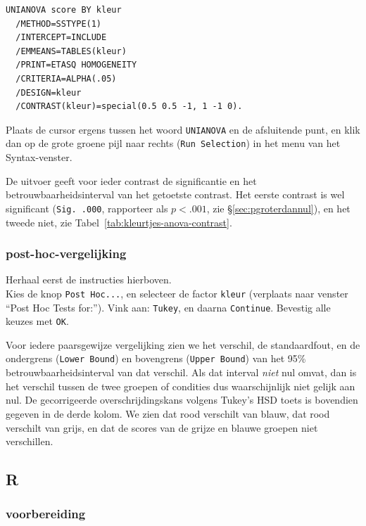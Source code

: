 \documentclass[
]{book}
\begin{document}
\begin{verbatim}
UNIANOVA score BY kleur
  /METHOD=SSTYPE(1)
  /INTERCEPT=INCLUDE
  /EMMEANS=TABLES(kleur) 
  /PRINT=ETASQ HOMOGENEITY
  /CRITERIA=ALPHA(.05)
  /DESIGN=kleur
  /CONTRAST(kleur)=special(0.5 0.5 -1, 1 -1 0).
\end{verbatim}

Plaats de cursor ergens tussen het woord \texttt{UNIANOVA} en de afsluitende
punt, en klik dan op de grote groene pijl naar rechts (\texttt{Run\ Selection})
in het menu van het Syntax-venster.

De uitvoer geeft voor ieder contrast de significantie en het
betrouwbaarheidsinterval van het getoetste contrast. Het eerste contrast
is wel significant (\texttt{Sig.\ .000}, rapporteer als \(p<.001\), zie §\ref{sec:pgroterdannul}), en het tweede niet, zie
Tabel~\ref{tab:kleurtjes-anova-contrast}.

\hypertarget{post-hoc-vergelijking}{%
\subsubsection{post-hoc-vergelijking}\label{post-hoc-vergelijking}}

Herhaal eerst de instructies hierboven.\\
Kies de knop \texttt{Post\ Hoc...}, en selecteer de factor \texttt{kleur}
(verplaats naar venster ``Post Hoc Tests for:''). Vink aan: \texttt{Tukey}, en
daarna \texttt{Continue}. Bevestig alle keuzes met \texttt{OK}.

Voor iedere paarsgewijze vergelijking zien we het verschil, de
standaardfout, en de ondergrens (\texttt{Lower\ Bound}) en bovengrens
(\texttt{Upper\ Bound}) van het 95\% betrouwbaarheidsinterval van dat verschil.
Als dat interval \emph{niet} nul omvat, dan is het verschil tussen de twee
groepen of condities dus waarschijnlijk niet gelijk aan nul. De
gecorrigeerde overschrijdingskans volgens Tukey's HSD toets is bovendien
gegeven in de derde kolom. We zien dat rood verschilt van blauw, dat
rood verschilt van grijs, en dat de scores van de grijze en blauwe
groepen niet verschillen.

\hypertarget{r-14}{%
\subsection{R}\label{r-14}}

\hypertarget{voorbereiding-1}{%
\subsubsection{voorbereiding}\label{voorbereiding-1}}
\end{document}
